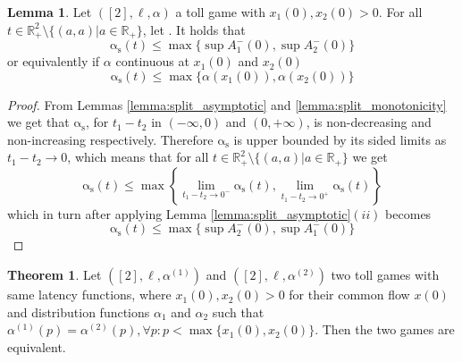\documentclass[10pt,a4paper]{book}
\newcommand{\as}{\mathrm{\alpha_s}}
\newcommand{\R}{\mathbb{R}}
\theoremstyle{definition}
\newtheorem{theorem}[definition]{Theorem}
\newtheorem{lemma}[definition]{Lemma}
\theoremstyle{comment}
\begin{document}
\begin{lemma}
	\label{lemma:as_upper_bound}
	Let $([2], \ell, \alpha)$ a toll game with $x_1(0), x_2(0) > 0$.
	For all $t \in \R_+^2 \setminus \{(a, a) | a \in \R_+\}$, let .
	It holds that
	\[\as(t) \le \max\{\sup A_1^-(0), \sup A_2^-(0)\}\]
	or equivalently if $\alpha$ continuous at $x_1(0)$ and $x_2(0)$
	\[\as(t) \le \max\{\alpha(x_1(0)), \alpha(x_2(0))\}\]
\end{lemma}

\begin{proof}
	 From Lemmas \ref{lemma:split_asymptotic} and \ref{lemma:split_monotonicity} we get that $\as$, for $t_1 - t_2$ in $(-\infty, 0)$ and $(0, +\infty)$, is non-decreasing and non-increasing respectively.
	 Therefore $\as$ is upper bounded by its sided limits as $t_1 - t_2 \rightarrow 0$, which means that for all $t \in \R_+^2 \setminus \{(a, a) | a \in \R_+\}$ we get
	 \[\as(t) \le \max\left\{\lim_{t_1 - t_2 \rightarrow 0^-}\as(t), \lim_{t_1 - t_2 \rightarrow 0^+}\as(t)\right\}\]
	 which in turn after applying Lemma \ref{lemma:split_asymptotic}$(ii)$ becomes
	 \[\as(t) \le \max\{\sup A_2^-(0), \sup A_1^-(0)\}\]
\end{proof}

\begin{theorem}
	\label{theorem:alpha_upper_irrelevant}
	Let $([2], \ell, \alpha^{(1)})$ and $([2], \ell, \alpha^{(2)})$ two toll games with same latency functions, where $x_1(0), x_2(0) > 0$ for their common flow $x(0)$ and distribution functions $\alpha_1$ and $\alpha_2$ such that $\alpha^{(1)}(p) = \alpha^{(2)}(p), \forall p: p < \max\{x_1(0), x_2(0)\}$.
	Then the two games are equivalent.
\end{theorem}
\end{document}
